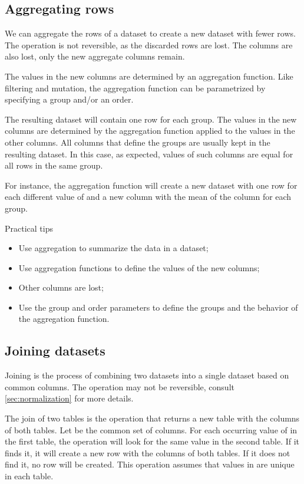 \subsection{Aggregating rows}

We can aggregate the rows of a dataset to create a new dataset with fewer rows.    The
operation is not reversible, as the discarded rows are lost.  The columns are also lost,
only the new aggregate columns remain.

The values in the new columns are determined by an aggregation function.  Like filtering
and mutation, the aggregation function can be parametrized by specifying a group and/or an
order.

The resulting dataset will contain one row for each group.  The values in the new columns
are determined by the aggregation function applied to the values in the other columns.
All columns that define the groups are usually kept in the resulting dataset.  In this
case, as expected, values of such columns are equal for all rows in the same group.

For instance, the aggregation function  will create a
new dataset with one row for each different value of  and a new column
with the mean of the  column for each group.

\begin{hlbox}{Practical tips}
  \begin{itemize}
    \item Use aggregation to summarize the data in a dataset;
    \item Use aggregation functions to define the values of the new columns;
    \item Other columns are lost;
    \item Use the group and order parameters to define the groups and the behavior of the
      aggregation function.
  \end{itemize}
\end{hlbox}


\subsection{Joining datasets}

Joining is the process of combining two datasets into a single dataset based on common
columns.  The operation may not be reversible, consult \cref{sec:normalization} for more
details.

The join of two tables is the operation that returns a new table with the columns of both
tables.  Let  be the common set of columns.  For each occurring value of
 in the first table, the operation will look for the same value in the second
table.  If it finds it, it will create a new row with the columns of both tables.  If it
does not find it, no row will be created.  This operation assumes that values in 
are unique in each table.

